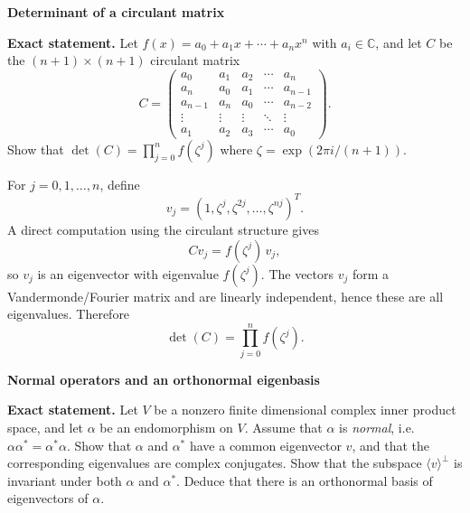 \begin{problem}[CP-I-0109]
\label{prob:cp-i-0109}
\textbf{Determinant of a circulant matrix}

\textbf{Exact statement.}
\hspace*{1.5em}Let $f(x)=a_0+a_1x+\cdots +a_n x^n$ with $a_i\in\mathbb C$, and let $C$ be the $(n+1)\times(n+1)$ circulant matrix
\[
C=\begin{pmatrix}
	a_0&a_1&a_2&\cdots&a_n\\
	a_n&a_0&a_1&\cdots&a_{n-1}\\
	a_{n-1}&a_n&a_0&\cdots&a_{n-2}\\
	\vdots&\vdots&\vdots&\ddots&\vdots\\
	a_1&a_2&a_3&\cdots&a_0
\end{pmatrix}.
\]
Show that $\det(C)=\prod_{j=0}^{n} f(\zeta^j)$ where $\zeta=\exp(2\pi i/(n+1))$.
\end{problem}

\begin{solution}
For $j=0,1,\dots,n$, define
\[
v_j=(1,\zeta^j,\zeta^{2j},\dots,\zeta^{nj})^T.
\]
A direct computation using the circulant structure gives
\[
Cv_j=f(\zeta^j)\,v_j,
\]
so $v_j$ is an eigenvector with eigenvalue $f(\zeta^j)$.
The vectors $v_j$ form a Vandermonde/Fourier matrix and are linearly independent, hence these are all eigenvalues.
Therefore
\[
\det(C)=\prod_{j=0}^{n} f(\zeta^j).
\]
\end{solution}

\begin{problem}[CP-I-0110]
\label{prob:cp-i-0110}
\textbf{Normal operators and an orthonormal eigenbasis}

\textbf{Exact statement.}
\hspace*{1.5em}Let $V$ be a nonzero finite dimensional complex inner product space, and let $\alpha$ be an endomorphism on $V$.
Assume that $\alpha$ is \emph{normal}, i.e.\ $\alpha\alpha^*=\alpha^*\alpha$.
Show that $\alpha$ and $\alpha^*$ have a common eigenvector $v$, and that the corresponding eigenvalues are complex conjugates.
Show that the subspace $\langle v\rangle^\perp$ is invariant under both $\alpha$ and $\alpha^*$.
Deduce that there is an orthonormal basis of eigenvectors of $\alpha$.

\end{problem}

